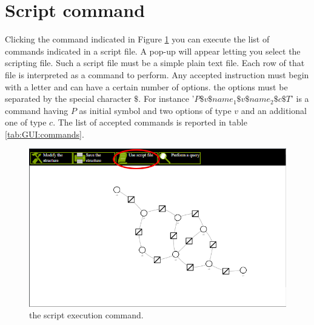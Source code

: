 \section{Script command}

Clicking the command indicated in Figure \ref{fig:script} you can execute the list of commands indicated in a script file. A pop-up will appear letting you select the scripting file. Such a script file must be a simple plain text file. Each row of that file is interpreted as a command to perform.
Any accepted instruction must begin with a letter and can have a certain number of options. the options must be separated by the special character $\$$.
For instance '$P\$v\$name_1\$v\$name_2\$c\$T$' is a command having $P$ as initial symbol and two options of type $v$ and an additional one of type $c$.
The list of accepted commands is reported in table \ref{tab:GUI:commands}.

\begin{figure}
	\centering
	\includegraphics[width= 0.49 \columnwidth]{../src/Chapter_additional/04_EFG_GUI/image/img_06.png}
	\caption{the script execution command.}
	\label{fig:script}
\end{figure} 

